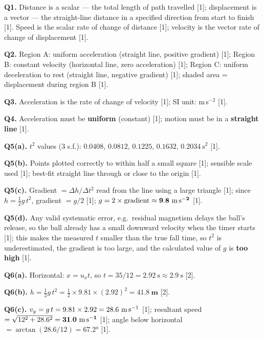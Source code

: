 \begin{markscheme}

\textbf{Q1.} Distance is a scalar — the total length of path travelled [1]; displacement is a vector — the straight-line distance in a specified direction from start to finish [1]. Speed is the scalar rate of change of distance [1]; velocity is the vector rate of change of displacement [1].

\vspace{0.5em}\textbf{Q2.} Region A: uniform acceleration (straight line, positive gradient) [1]; Region B: constant velocity (horizontal line, zero acceleration) [1]; Region C: uniform deceleration to rest (straight line, negative gradient) [1]; shaded area = displacement during region B [1].

\vspace{0.5em}\textbf{Q3.} Acceleration is the rate of change of velocity [1]; SI unit: m\,s$^{-2}$ [1].

\vspace{0.5em}\textbf{Q4.} Acceleration must be \textbf{uniform} (constant) [1]; motion must be in a \textbf{straight line} [1].

\vspace{0.5em}\textbf{Q5(a).} $t^2$ values (3 s.f.): $0.0408$, $0.0812$, $0.1225$, $0.1632$, $0.2034\ \text{s}^2$ [1].

\vspace{0.5em}\textbf{Q5(b).} Points plotted correctly to within half a small square [1]; sensible scale used [1]; best-fit straight line through or close to the origin [1].

\vspace{0.5em}\textbf{Q5(c).} Gradient $= \Delta h / \Delta t^2$ read from the line using a large triangle [1]; since $h = \tfrac{1}{2}g\,t^2$, gradient $= g/2$ [1]; $g = 2 \times \text{gradient} \approx \mathbf{9.8\ \text{m\,s}^{-2}}$ [1].

\vspace{0.5em}\textbf{Q5(d).} Any valid systematic error, e.g.\ residual magnetism delays the ball's release, so the ball already has a small downward velocity when the timer starts [1]; this makes the measured $t$ smaller than the true fall time, so $t^2$ is underestimated, the gradient is too large, and the calculated value of $g$ is \textbf{too high} [1].

\vspace{0.5em}\textbf{Q6(a).} Horizontal: $x = u_x t$, so $t = 35/12 = 2.92\ \text{s} \approx 2.9\ \text{s}$ [2].

\vspace{0.5em}\textbf{Q6(b).} $h = \tfrac{1}{2}g\,t^2 = \tfrac{1}{2} \times 9.81 \times (2.92)^2 = \mathbf{41.8\ \text{m}}$ [2].

\vspace{0.5em}\textbf{Q6(c).} $v_y = g\,t = 9.81 \times 2.92 = 28.6\ \text{m\,s}^{-1}$ [1]; resultant speed $= \sqrt{12^2 + 28.6^2} = \mathbf{31.0\ \text{m\,s}^{-1}}$ [1]; angle below horizontal $= \arctan(28.6/12) = \mathbf{67.2°}$ [1].

\end{markscheme}

